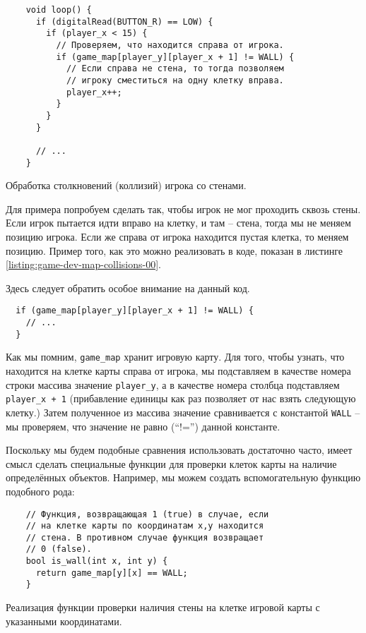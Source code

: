 \documentclass[../sparc.tex]{subfiles}
\begin{document}
\begin{listing}[H]
  \begin{verbatim}
    void loop() {
      if (digitalRead(BUTTON_R) == LOW) {
        if (player_x < 15) {
          // Проверяем, что находится справа от игрока.
          if (game_map[player_y][player_x + 1] != WALL) {
            // Если справа не стена, то тогда позволяем
            // игроку сместиться на одну клетку вправа.
            player_x++;
          }
        }
      }

      // ...
    }
  \end{verbatim}
  \caption{Обработка столкновений (коллизий) игрока со стенами.}
  \label{listing:game-dev-map-collisions-00}
\end{listing}

Для примера попробуем сделать так, чтобы игрок не мог проходить сквозь стены.
Если игрок пытается идти вправо на клетку, и там -- стена, тогда мы не меняем
позицию игрока. Если же справа от игрока находится пустая клетка, то меняем
позицию.  Пример того, как это можно реализовать в коде, показан в листинге
\ref{listing:game-dev-map-collisions-00}.

Здесь следует обратить особое внимание на данный код.

\begin{verbatim}
  if (game_map[player_y][player_x + 1] != WALL) {
    // ...
  }
\end{verbatim}

Как мы помним, \texttt{game\_map} хранит игровую карту.  Для того, чтобы узнать,
что находится на клетке карты справа от игрока, мы подставляем в качестве номера
строки массива значение \texttt{player\_y}, а в качестве номера столбца
подставляем \texttt{player\_x + 1} (прибавление единицы как раз позволяет от нас
взять следующую клетку.)  Затем полученное из массива значение сравнивается с
константой \texttt{WALL} -- мы проверяем, что значение не равно (``!='') данной
константе.

Поскольку мы будем подобные сравнения использовать достаточно часто, имеет смысл
сделать специальные функции для проверки клеток карты на наличие определённых
объектов.  Например, мы можем создать вспомогательную функцию подобного рода:

\begin{listing}[H]
  \begin{verbatim}
    // Функция, возвращающая 1 (true) в случае, если
    // на клетке карты по координатам x,y находится
    // стена. В противном случае функция возвращает
    // 0 (false).
    bool is_wall(int x, int y) {
      return game_map[y][x] == WALL;
    }
  \end{verbatim}
  \caption{Реализация функции проверки наличия стены на клетке игровой карты с
    указанными координатами.}
  \label{listing:game-dev-map-collisions-01}
\end{listing}
\end{document}
